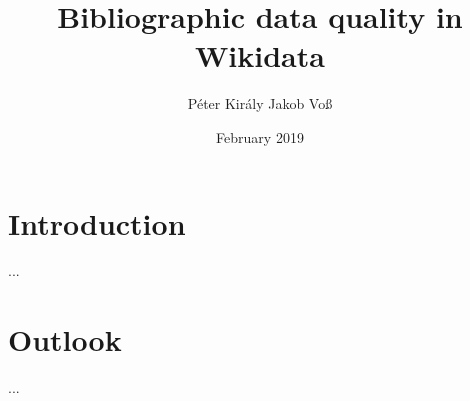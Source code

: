 \documentclass[prodmode,acmtecs]{acmsmall}
\title{Bibliographic data quality in Wikidata}
\author{Péter Király
\affil{GWDG}
Jakob Voß
\affil{VZG}}
\date{February 2019}
\begin{document}
\maketitle

\section{Introduction}
...

\section{Outlook}
...

%
%
\end{document}
